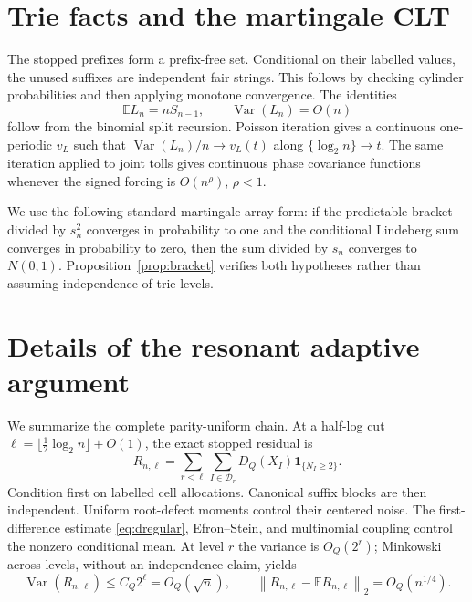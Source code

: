 \documentclass[11pt]{article}
\numberwithin{equation}{section}
\theoremstyle{definition}\newtheorem{definition}[theorem]{Definition}
\theoremstyle{remark}\newtheorem{remark}[theorem]{Remark}
\newcommand{\E}{\mathbb E}\newcommand{\Pp}{\mathbb P}
\newcommand{\Var}{\operatorname {Var}}\newcommand{\Cov}{\operatorname {Cov}}
\newcommand{\1}{\mathbf 1}\newcommand{\cD}{\mathcal D}
\newcommand{\norm}[1]{\left\lVert#1\right\rVert}
\begin{document}
\clearpage
\section{Trie facts and the martingale CLT}\label{app:trie}
The stopped prefixes form a prefix-free set.  Conditional on their labelled
values, the unused suffixes are independent fair strings.  This follows by
checking cylinder probabilities and then applying monotone convergence.
The identities
\begin{equation}\E L_n=nS_{n-1},\qquad \Var(L_n)=O(n)           \label{eq:triefacts}
\end{equation}
follow from the binomial split recursion.  Poisson iteration gives a
continuous one-periodic $v_L$ such that $\Var(L_n)/n\to v_L(t)$ along
$\{\log_2n\}\to t$.  The same iteration applied to joint tolls gives
continuous phase covariance functions whenever the signed forcing is
$O(n^\rho)$, $\rho<1$.

We use the following standard martingale-array form: if the predictable
bracket divided by $s_n^2$ converges in probability to one and the
conditional Lindeberg sum converges in probability to zero, then the sum
divided by $s_n$ converges to $N(0,1)$.  Proposition~\ref{prop:bracket}
verifies both hypotheses rather than assuming independence of trie levels.

\clearpage
\section{Details of the resonant adaptive argument}\label{app:resonant}
We summarize the complete parity-uniform chain.  At a half-log cut
$\ell=\lfloor\tfrac12\log_2n\rfloor+O(1)$, the exact stopped residual is
\begin{equation}R_{n,\ell}=\sum_{r<\ell}\sum_{I\in\cD_r}
 D_Q(X_I)\1_{\{N_I\ge2\}}.                                  \label{eq:residual}
\end{equation}
Condition first on labelled cell allocations.  Canonical suffix blocks are
then independent.  Uniform root-defect moments control their centered
noise.  The first-difference estimate \eqref{eq:dregular}, Efron--Stein,
and multinomial coupling control the nonzero conditional mean.  At level
$r$ the variance is $O_Q(2^r)$; Minkowski across levels, without an
independence claim, yields
\begin{equation}\Var(R_{n,\ell})\le C_Q2^\ell=O_Q(\sqrt n),
 \qquad\norm{R_{n,\ell}-\E R_{n,\ell}}_2=O_Q(n^{1/4}).          \label{eq:residualbound}
\end{equation}
\end{document}
